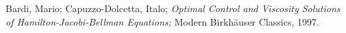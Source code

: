 \begin{thebibliography}{A}

Bardi, Mario; Capuzzo-Dolcetta, Italo;
\emph{Optimal Control and Viscosity Solutions of Hamilton-Jacobi-Bellman Equations;}
Modern Birkh\"auser Classics, 1997.

\end{thebibliography}